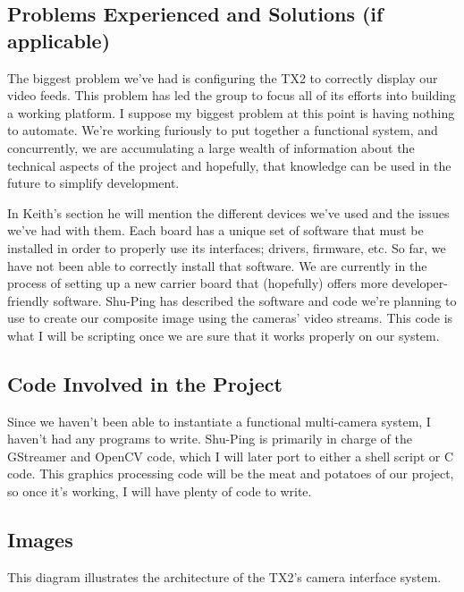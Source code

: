 \documentclass[letterpaper,10pt,serif,draftclsnofoot,onecolumn,compsoc,titlepage]{IEEEtran}
\begin{document}
\subsection{Problems Experienced and Solutions (if applicable)}
The biggest problem we've had is configuring the TX2 to correctly display our video feeds. This problem has led the group to focus all of its efforts into building a working platform. I suppose my biggest problem at this point is having nothing to automate. We're working furiously to put together a functional system, and concurrently, we are accumulating a large wealth of information about the technical aspects of the project and hopefully, that knowledge can be used in the future to simplify development. 

In Keith's section he will mention the different devices we've used and the issues we've had with them. Each board has a unique set of software that must be installed in order to properly use its interfaces; drivers, firmware, etc. So far, we have not been able to correctly install that software. We are currently in the process of setting up a new carrier board that (hopefully) offers more developer-friendly software. Shu-Ping has described the software and code we're planning to use to create our composite image using the cameras' video streams. This code is what I will be scripting once we are sure that it works properly on our system.

\subsection{Code Involved in the Project}
Since we haven't been able to instantiate a functional multi-camera system, I haven't had any programs to write. Shu-Ping is primarily in charge of the GStreamer and OpenCV code, which I will later port to either a shell script or C code. This graphics processing code will be the meat and potatoes of our project, so once it's working, I will have plenty of code to write.

\newpage
\subsection{Images}
This diagram illustrates the architecture of the TX2's camera interface system. 
\end{document}
